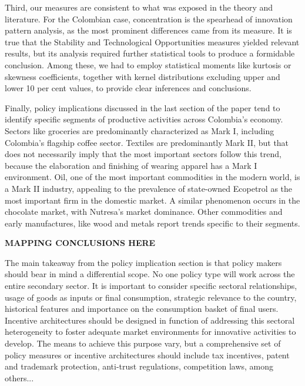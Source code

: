 \documentclass[12pt,a4paper]{article}
\begin{document}
Third, our measures are consistent to what was exposed in the theory and literature. For the Colombian case, concentration is the spearhead of innovation pattern analysis, as the most prominent differences came from its measure. It is true that the Stability and Technological Opportunities measures yielded relevant results, but its analysis required further statistical tools to produce a formidable conclusion. Among these, we had to employ statistical moments like kurtosis or skewness coefficients, together with kernel distributions excluding upper and lower 10 per cent values, to provide clear inferences and conclusions. 

Finally, policy implications discussed in the last section of the paper tend to identify specific segments of productive activities across Colombia’s economy. Sectors like groceries are predominantly characterized as Mark I, including Colombia’s flagship coffee sector. Textiles are predominantly Mark II, but that does not necessarily imply that the most important sectors follow this trend, because the elaboration and finishing of wearing apparel has a Mark I environment. Oil, one of the most important commodities in the modern world, is a Mark II industry, appealing to the prevalence of state-owned Ecopetrol as the most important firm in the domestic market. A similar phenomenon occurs in the chocolate market, with Nutresa's market dominance. Other commodities and early manufactures, like wood and metals report trends specific to their segments. 

\textbf{MAPPING CONCLUSIONS HERE}

The main takeaway from the policy implication section is that policy makers should bear in mind a differential scope. No one policy type will work across the entire secondary sector. It is important to consider specific sectoral relationships, usage of goods as inputs or final consumption, strategic relevance to the country, historical features and importance on the consumption basket of final users. Incentive architectures should be designed in function of addressing this sectoral heterogeneity to foster adequate market environments for innovative activities to develop. The means to achieve this purpose vary, but a comprehensive set of policy measures or incentive architectures should include tax incentives, patent and trademark protection, anti-trust regulations, competition laws, among others... 
\end{document}

